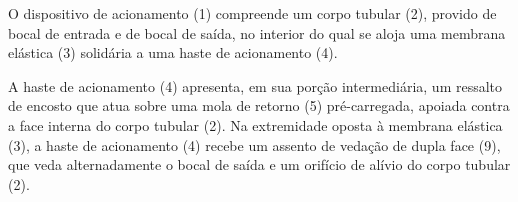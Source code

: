 

\pnum O dispositivo de acionamento (1) compreende um corpo tubular (2), provido
de bocal de entrada e de bocal de saída, no interior do qual se aloja uma
membrana elástica (3) solidária a uma haste de acionamento (4).

\pnum A haste de acionamento (4) apresenta, em sua porção intermediária, um
ressalto de encosto que atua sobre uma mola de retorno (5) pré-carregada,
apoiada contra a face interna do corpo tubular (2). Na extremidade oposta à
membrana elástica (3), a haste de acionamento (4) recebe um assento de vedação
de dupla face (9), que veda alternadamente o bocal de saída e um orifício de
alívio do corpo tubular (2).

